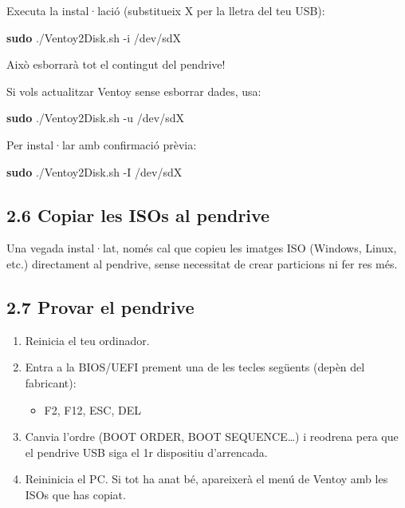 \documentclass[
  12 pt,
  a4paper,
]{article}
\newenvironment{Shaded}{\begin{snugshade}}{\end{snugshade}}
\newcommand{\AttributeTok}[1]{\textcolor[rgb]{0.13,0.29,0.53}{#1}}
\newcommand{\FunctionTok}[1]{\textcolor[rgb]{0.13,0.29,0.53}{\textbf{#1}}}
\newcommand{\NormalTok}[1]{#1}
\providecommand{\tightlist}{%
  \setlength{\itemsep}{0pt}\setlength{\parskip}{0pt}}
\begin{document}
Executa la instal·lació (substitueix X per la lletra del teu USB):

\begin{Shaded}
\begin{Highlighting}[]
\FunctionTok{sudo}\NormalTok{ ./Ventoy2Disk.sh }\AttributeTok{{-}i}\NormalTok{ /dev/sdX}
\end{Highlighting}
\end{Shaded}

Això esborrarà tot el contingut del pendrive!

Si vols actualitzar Ventoy sense esborrar dades, usa:

\begin{Shaded}
\begin{Highlighting}[]
\FunctionTok{sudo}\NormalTok{ ./Ventoy2Disk.sh }\AttributeTok{{-}u}\NormalTok{ /dev/sdX}
\end{Highlighting}
\end{Shaded}

Per instal·lar amb confirmació prèvia:

\begin{Shaded}
\begin{Highlighting}[]
\FunctionTok{sudo}\NormalTok{ ./Ventoy2Disk.sh }\AttributeTok{{-}I}\NormalTok{ /dev/sdX}
\end{Highlighting}
\end{Shaded}

\subsection{2.6 Copiar les ISOs al
pendrive}\label{copiar-les-isos-al-pendrive}

Una vegada instal·lat, només cal que copieu les imatges ISO (Windows,
Linux, etc.) directament al pendrive, sense necessitat de crear
particions ni fer res més.

\subsection{2.7 Provar el pendrive}\label{provar-el-pendrive}

\begin{enumerate}
\def\labelenumi{\arabic{enumi}.}
\tightlist
\item
  Reinicia el teu ordinador.\\
\item
  Entra a la BIOS/UEFI prement una de les tecles següents (depèn del
  fabricant):

  \begin{itemize}
  \tightlist
  \item
    F2, F12, ESC, DEL\\
  \end{itemize}
\item
  Canvia l'ordre (BOOT ORDER, BOOT SEQUENCE\ldots) i reodrena pera que
  el pendrive USB siga el 1r dispositiu d'arrencada.
\item
  Reininicia el PC. Si tot ha anat bé, apareixerà el menú de Ventoy amb
  les ISOs que has copiat.
\end{enumerate}
\end{document}
